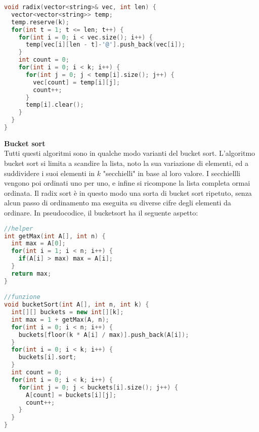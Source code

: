 \documentclass[a4paper,12pt]{article}
\begin{document}
\begin{lstlisting}[language=C++]
void radix(vector<string>& vec, int len) {
  vector<vector<string>> temp;
  temp.reserve(k);
  for(int t = 1; t <= len; t++) {
    for(int i = 0; i < vec.size(); i++) {
      temp[vec[i][len - t]-'@'].push_back(vec[i]);
    }
    int count = 0;
    for(int i = 0; i < k; i++) {
      for(int j = 0; j < temp[i].size(); j++) {
        vec[count] = temp[i][j];
        count++;
      }
      temp[i].clear();
    }
  } 
}
\end{lstlisting}
\par\smallskip
\textbf{Bucket sort} \\
Tutti questi algoritmi sono in qualche modo varianti del bucket sort. L'algoritmo bucket sort si limita a scandire la lista,
noto la sua variazione di elementi, ed a suddividere i suoi elementi in $k$ "secchielli" in base al loro valore. I secchiellli
vengono poi ordinati uno per uno, e infine si ricompone la lista completa ormai ordinata. Il radix sort è in questo modo una sorta
di bucket sort ripetuto, senza alcun passo di ordinamento ma eseguita su diverse cifre degli elementi da ordinare.
In pseudocodice, il bucketsort ha il seguente aspetto:
\begin{lstlisting}[language=C++]
//helper
int getMax(int A[], int n) {
  int max = A[0];
  for(int i = 1; i < n; i++) {
    if(A[i] > max) max = A[i];
  }
  return max;
}

//funzione
void bucketSort(int A[], int n, int k) {
  int[][] buckets = new int[][k];
  int max = 1 + getMax(A, n);
  for(int i = 0; i < n; i++) {
    buckets[floor(k * A[i] / max)].push_back(A[i]);
  }
  for(int i = 0; i < k; i++) {
    buckets[i].sort;
  }
  int count = 0;
  for(int i = 0; i < k; i++) {
    for(int j = 0; j < buckets[i].size(); j++) {
      A[count] = buckets[i][j];
      count++;
    }
  }
}
\end{lstlisting}
\end{document}
